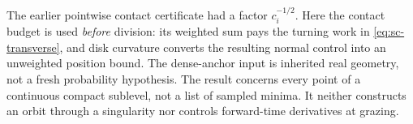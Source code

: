 \begin{scremark}
The earlier pointwise contact certificate had a factor $c_i^{-1/2}$. Here the contact budget is used \emph{before} division: its weighted sum pays the turning work in \eqref{eq:sc-transverse}, and disk curvature converts the resulting normal control into an unweighted position bound. The dense-anchor input is inherited real geometry, not a fresh probability hypothesis. The result concerns every point of a continuous compact sublevel, not a list of sampled minima. It neither constructs an orbit through a singularity nor controls forward-time derivatives at grazing.
\end{scremark}
